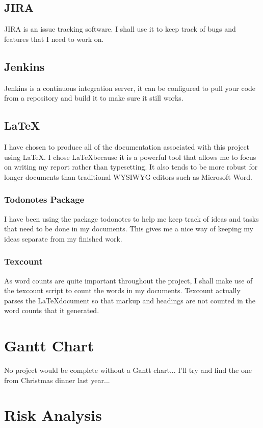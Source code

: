\documentclass[12pt]{report}
\begin{document}
\subsection{JIRA}
JIRA is an issue tracking software. I shall use it to keep track of bugs and
features that I need to work on. 

\subsection{Jenkins}
Jenkins is a continuous integration server, it can be configured to pull your
code from a repository and build it to make sure it still works.  

\subsection{\LaTeX}
I have chosen to produce all of the documentation associated with this project
using \LaTeX. I chose \LaTeX because it is a powerful tool that allows me to
focus on writing my report rather than typesetting. It also tends to be more
robust for longer documents than traditional WYSIWYG editors such as Microsoft
Word.

\subsubsection{Todonotes Package}
I have been using the package todonotes to help me keep track of ideas and tasks 
that need to be done in my documents. This gives me a nice way of keeping my
ideas separate from my finished work.

\subsubsection{Texcount}
As word counts are quite important throughout the project, I shall make use of
the texcount script to count the words in my documents. Texcount actually parses
the \LaTeX document so that markup and headings are not counted in the word
counts that it generated. 


\section{Gantt Chart}
No project would be complete without a Gantt chart... I'll try and find the one
from Christmas dinner last year...


\section{Risk Analysis}
\end{document}
